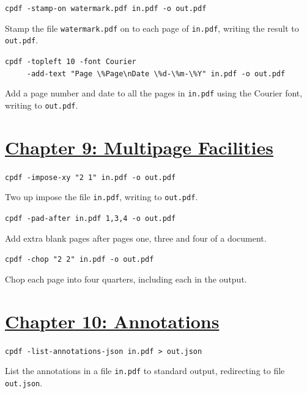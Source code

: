 \documentclass{book}
\begin{document}
\begin{framed}\noindent\texttt{cpdf -stamp-on watermark.pdf in.pdf -o out.pdf}\end{framed}

\noindent Stamp the file \texttt{watermark.pdf} on to each page of \texttt{in.pdf}, writing the result to \texttt{out.pdf}.

\begin{framed}
 \noindent\small\verb?cpdf -topleft 10 -font Courier?\\
 \noindent\small\verb?     -add-text "Page \%Page\nDate \%d-\%m-\%Y" in.pdf -o out.pdf?
\end{framed}

\noindent Add a page number and date to all the pages in \texttt{in.pdf} using the Courier font, writing to \texttt{out.pdf}.

\section*{\hyperref[chap:9]{Chapter 9: Multipage Facilities}}

\begin{framed}\noindent\texttt{cpdf -impose-xy "2 1" in.pdf -o out.pdf}\end{framed}

\noindent Two up impose the file \texttt{in.pdf}, writing to \texttt{out.pdf}.

\begin{framed}\noindent\texttt{cpdf -pad-after in.pdf 1,3,4 -o out.pdf}\end{framed}

\noindent Add extra blank pages after pages one, three and four of a document.

\begin{framed}\noindent\texttt{cpdf -chop "2 2" in.pdf -o out.pdf}\end{framed}

\noindent Chop each page into four quarters, including each in the output.

\section*{\hyperref[chap:10]{Chapter 10: Annotations}}

\begin{framed}\noindent\texttt{cpdf -list-annotations-json in.pdf > out.json}\end{framed}

\noindent List the annotations in a file \texttt{in.pdf} to standard output, redirecting to file \texttt{out.json}.
\end{document}
